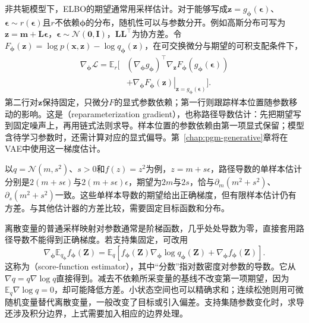 非共轭模型下，ELBO的期望通常用采样估计。对于能够写成$\bm z=g_{\bm{\phi}}(\bm\epsilon)$、$\bm\epsilon\sim r(\bm\epsilon)$且$r$不依赖$\bm{\phi}$的分布，随机性可以与参数分开。例如高斯分布可写为$\bm z=\bm m+\bm L\bm\epsilon$，$\bm\epsilon\sim\mathcal N(\bm0,\bm I)$，$\bm L\bm L^\top$为协方差。令$F_{\bm{\phi}}(\bm z)=\log p(\bm x,\bm z)-\log q_{\bm{\phi}}(\bm z)$，在可交换微分与期望的可积支配条件下，
\begin{equation}
  \begin{aligned}
    \nabla_{\bm{\phi}}\mathcal L
      =\mathbb E_r\big[
        &(\nabla_{\bm{\phi}}g_{\bm{\phi}})^\top
           \nabla_{\bm z}F_{\bm{\phi}}
                (g_{\bm{\phi}}(\bm\epsilon))\\
        &+\left.\nabla_{\bm{\phi}}F_{\bm{\phi}}(\bm z)
          \right|_{\bm z=g_{\bm{\phi}}(\bm\epsilon)}
        \big].
  \end{aligned}
  \label{eq:pgm-variational-pathwise}
\end{equation}
第二行对$\bm z$保持固定，只微分$F$的显式参数依赖；第一行则跟踪样本位置随参数移动的影响。这是（reparameterization gradient），也称路径导数估计：先把期望写到固定噪声上，再用链式法则求导。样本位置的参数依赖由第一项显式保留；模型含待学习参数时，还需计算对应的显式偏导。第~\ref{chap:pgm-generative}章将在VAE中使用这一梯度估计。

以$q=\mathcal N(m,s^2)$、$s>0$和$f(z)=z^2$为例，$z=m+s\epsilon$，路径导数的单样本估计分别是$2(m+s\epsilon)$与$2(m+s\epsilon)\epsilon$，期望为$2m$与$2s$，恰与$\partial_m(m^2+s^2)$、$\partial_s(m^2+s^2)$一致。这些单样本导数的期望给出正确梯度，但有限样本估计仍有方差。与其他估计器的方差比较，需要固定目标函数和分布。

离散变量的普通采样映射对参数通常是阶梯函数，几乎处处导数为零，直接套用路径导数不能得到正确梯度。若支持集固定，可改用
\begin{equation}
  \nabla_{\bm{\phi}}\mathbb E_{q_{\bm{\phi}}}f_{\bm{\phi}}(\bm Z)
    =\mathbb E_q\!\left[
       f_{\bm{\phi}}(\bm Z)\nabla_{\bm{\phi}}\log q_{\bm{\phi}}(\bm Z)
       +\nabla_{\bm{\phi}}f_{\bm{\phi}}(\bm Z)\right].
  \label{eq:pgm-variational-score-function}
\end{equation}
这称为（score-function estimator），其中“分数”指对数密度对参数的导数。它从$\nabla q=q\nabla\log q$直接得到。减去不依赖所采变量的基线不改变第一项期望，因为$\mathbb E_q\nabla\log q=0$，却可能降低方差。小状态空间也可以精确求和；连续松弛则用可微随机变量替代离散变量，一般改变了目标或引入偏差。支持集随参数变化时，求导还涉及积分边界，上式需要加入相应的边界处理。

